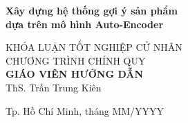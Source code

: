 \begin{titlepage}
\begin{center}
{ \Large \bfseries Xây dựng hệ thống gợi ý sản phẩm\\dựa trên mô hình Auto-Encoder\\[2cm] } 


\large KHÓA LUẬN TỐT NGHIỆP CỬ NHÂN\\
\large CHƯƠNG TRÌNH CHÍNH QUY\\[2cm]

\textbf{GIÁO VIÊN HƯỚNG DẪN}\\
ThS. Trần Trung Kiên\\



\vfill
Tp. Hồ Chí Minh, tháng MM/YYYY

\end{center}

\end{titlepage}